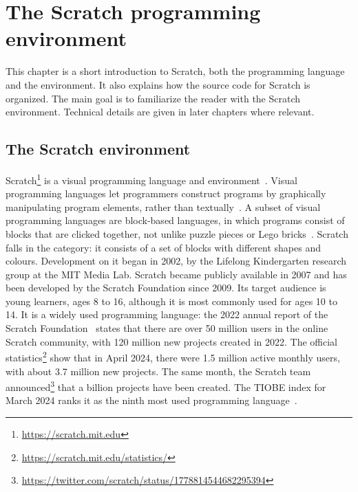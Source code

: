 \documentclass[../main]{subfiles}
\begin{document}
\chapter{The Scratch programming environment}\label{ch:scratch-the-programming-environment}


This chapter is a short introduction to Scratch, both the programming language and the environment.
It also explains how the source code for Scratch is organized.
The main goal is to familiarize the reader with the Scratch environment.
Technical details are given in later chapters where relevant.

\section{The Scratch environment}\label{sec:scratch-environment}

Scratch\footnote{\url{https://scratch.mit.edu}} is a visual programming language and environment~\autocite{resnickScratchProgrammingAll2009}.
Visual programming languages let programmers construct programs by graphically manipulating program elements, rather than textually~\autocite{kelleherLoweringBarriersProgramming2005}.
A subset of visual programming languages are block-based languages, in which programs consist of blocks that are clicked together, not unlike puzzle pieces or Lego bricks~\autocite{weintropBlockNotBlock2015}.
Scratch falls in the category: it consists of a set of blocks with different shapes and colours.
Development on it began in 2002, by the Lifelong Kindergarten research group at the MIT Media Lab.
Scratch became publicly available in 2007 and has been developed by the Scratch Foundation since 2009.
Its target audience is young learners, ages 8 to 16, although it is most commonly used for ages 10 to 14.
It is a widely used programming language: the 2022 annual report of the Scratch Foundation~\autocite{scratchfoundationGrowingGlobalCreative2022} states that there are over 50 million users in the online Scratch community, with 120 million new projects created in 2022.
The official statistics\footnote{\url{https://scratch.mit.edu/statistics/}} show that in April 2024, there were 1.5 million active monthly users, with about 3.7 million new projects.
The same month, the Scratch team announced\footnote{\url{https://twitter.com/scratch/status/1778814544682295394}} that a billion projects have been created.
The TIOBE index for March 2024 ranks it as the ninth most used programming language~\autocite{tiobeTIOBEIndexMarch2024}.
\end{document}
